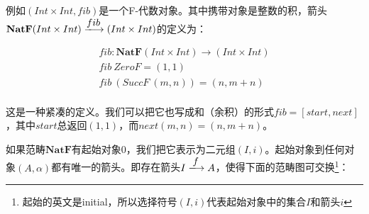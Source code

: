 \documentclass{article}
\begin{document}




例如$(Int \times Int, fib)$是一个F-代数对象。其中携带对象是整数的积，箭头$\mathbf{NatF} (Int \times Int) \arrowto{fib} (Int \times Int)$的定义为：

\[
\begin{array}{l}
fib : \mathbf{NatF} (Int \times Int) \to (Int \times Int) \\
fib\ ZeroF = (1, 1) \\
fib\ (SuccF\ (m, n)) = (n, m + n) \\
\end{array}
\]

这是一种紧凑的定义。我们可以把它也写成和（余积）的形式$fib = [start, next]$，其中$start$总返回$(1, 1)$，而$next(m, n) = (n, m + n)$。

如果范畴$\pmb{NatF}$有起始对象0，我们把它表示为二元组$(I, i)$。起始对象到任何对象$(A, \alpha)$都有唯一的箭头。即存在箭头$I \arrowto{f} A$，使得下面的范畴图可交换\footnote{起始的英文是initial，所以选择符号$(I, i)$代表起始对象中的集合$I$和箭头$i$}：

\begin{center}
\end{center}
\end{document}
